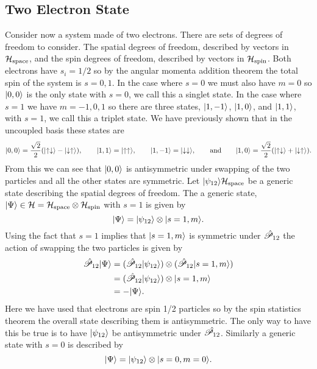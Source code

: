 \subsection{Two Electron State}
Consider now a system made of two electrons.
There are sets of degrees of freedom to consider.
The spatial degrees of freedom, described by vectors in \(\mathcal{H}_{\text{space}}\), and the spin degrees of freedom, described by vectors in \(\mathcal{H}_{\text{spin}}\).
Both electrons have \(s_i = 1/2\) so by the angular momenta addition theorem the total spin of the system is \(s = 0, 1\).
In the case where \(s = 0\) we must also have \(m = 0\) so \(\vert {0, 0} \rangle\) is the only state with \(s = 0\), we call this a singlet state.
In the case where \(s = 1\) we have \(m = -1, 0, 1\) so there are three states, \(\vert {1, -1} \rangle\), \(\vert {1, 0} \rangle\), and \(\vert {1, 1} \rangle\), with \(s = 1\), we call this a triplet state.
We have previously shown that in the uncoupled basis these states are
\[\vert {0, 0} \rangle = \frac{\sqrt{2}}{2}(\vert {\uparrow\downarrow} \rangle - \vert {\downarrow\uparrow} \rangle), \qquad \vert {1, 1} \rangle = \vert {\uparrow\uparrow} \rangle, \qquad \vert {1, -1} \rangle = \vert {\downarrow\downarrow} \rangle, \qquad\text{and}\qquad \vert {1, 0} \rangle = \frac{\sqrt{2}}{2}(\vert {\uparrow\downarrow} \rangle + \vert {\downarrow\uparrow} \rangle).\]
From this we can see that \(\vert {0, 0} \rangle\) is antisymmetric under swapping of the two particles and all the other states are symmetric.
Let \(\vert {\psi_{12}} \rangle\mathcal{H}_{\text{space}}\) be a generic state describing the spatial degrees of freedom.
The a generic state, \(\vert {\Psi} \rangle \in \mathcal{H} = \mathcal{H}_{\text{space}}\otimes\mathcal{H}_{\text{spin}}\) with \(s = 1\) is given by
\[\vert {\Psi} \rangle = \vert {\psi_{12}} \rangle\otimes\vert {s=1, m} \rangle.\]
Using the fact that \(s = 1\) implies that \(\vert {s=1, m} \rangle\) is symmetric under \(\hat{\mathscr{P}}_{12}\) the action of swapping the two particles is given by
\begin{align*}
    \hat{\mathscr{P}}_{12}\vert {\Psi} \rangle &= (\hat{\mathscr{P}}_{12}\vert {\psi_{12}} \rangle) \otimes (\hat{\mathscr{P}}_{12}\vert {s=1, m} \rangle)\\
    &= (\hat{\mathscr{P}}_{12}\vert {\psi_{12}} \rangle) \otimes \vert {s=1, m} \rangle\\
    &= -\vert {\Psi} \rangle.
\end{align*}
Here we have used that electrons are spin 1/2 particles so by the spin statistics theorem the overall state describing them is antisymmetric.
The only way to have this be true is to have \(\vert {\psi_{12}} \rangle\) be antisymmetric under \(\hat{\mathscr{P}_{12}}\).
Similarly a generic state with \(s=0\) is described by
\[\vert {\Psi} \rangle = \vert {\psi_{12}} \rangle\otimes\vert {s=0, m=0} \rangle.\]
